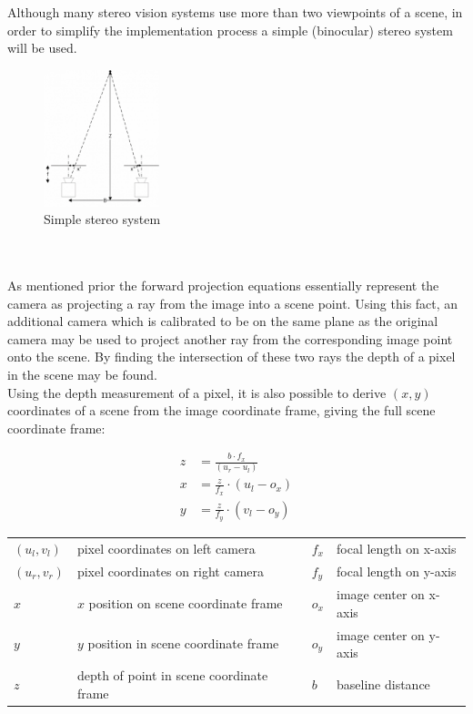 \documentclass[11pt]{scrartcl}
\begin{document}
\begin{remark}
  Although many stereo vision systems use more than two viewpoints of a scene,
  in order to simplify the implementation process a simple (binocular) stereo
  system will be used.
\end{remark}
\begin{figure}
  \centering
  \includegraphics[width=0.3\textwidth]{img2.resized.png}
  \caption{\label{fig:frog2}Simple stereo system}
\end{figure}
\\
\\

As mentioned prior the forward projection equations essentially represent the camera
as projecting a ray from the image into a scene point. Using this fact, an
additional camera which is calibrated to be on the same plane as the original camera
may be used to project another ray from the corresponding image point onto the scene. By
finding the intersection of these two rays the depth of a pixel in the scene may be found. 
\\
Using the depth measurement of a pixel, it is also possible to derive
$(x, y)$ coordinates of a scene from the image coordinate frame, giving
the full scene coordinate frame:

\begin{theorem}

  \begin{align}
    z & = \displaystyle\frac{b\cdot f_x}{(u_r-u_l)} \\
    x & = \displaystyle\frac{z}{f_x} \cdot (u_l - o_x) \\
    y & = \displaystyle\frac{z}{f_y} \cdot (v_l - o_y) 
  \end{align}

  \begin{figurekey}
    \begin{tabular}{llll}
      $(u_l,v_l)$ & pixel coordinates on left camera     & $f_x$ & focal length on x-axis \\
      $(u_r,v_r)$ & pixel coordinates on right camera   & $f_y$ & focal length on y-axis \\
      $x$     & $x$ position on scene coordinate frame  & $o_x$ & image center on x-axis \\
      $y$     & $y$ position in scene coordinate frame   & $o_y$ & image center on y-axis \\
        $z$     & depth of point in scene coordinate frame  &$b$ & baseline distance \\
    \end{tabular}
  \end{figurekey}
\end{theorem}
\end{document}
